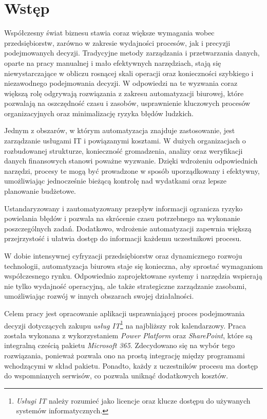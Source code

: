 \chapter{Wstęp}
Współczesny świat biznesu stawia coraz większe wymagania wobec przedsiębiorstw, zarówno w zakresie wydajności procesów, jak i precyzji podejmowanych decyzji. Tradycyjne metody zarządzania i przetwarzania danych, oparte na pracy manualnej i mało efektywnych narzędziach, stają się niewystarczające w obliczu rosnącej skali operacji oraz konieczności szybkiego i niezawodnego podejmowania decyzji. W odpowiedzi na te wyzwania coraz większą rolę odgrywają rozwiązania z zakresu automatyzacji biurowej, które pozwalają na oszczędność czasu i zasobów, usprawnienie kluczowych procesów organizacyjnych oraz minimalizację ryzyka błędów ludzkich.
\par Jednym z obszarów, w którym automatyzacja znajduje zastosowanie, jest zarządzanie usługami IT i powiązanymi kosztami. W dużych organizacjach o rozbudowanej strukturze, konieczność gromadzenia, analizy oraz weryfikacji danych finansowych stanowi poważne wyzwanie. Dzięki wdrożeniu odpowiednich narzędzi, procesy te mogą być prowadzone w sposób uporządkowany i efektywny, umożliwiając jednocześnie bieżącą kontrolę nad wydatkami oraz lepsze planowanie budżetowe.
\par   Ustandaryzowany i zautomatyzowany przepływ informacji ogranicza ryzyko powielania błędów i pozwala na skrócenie czasu potrzebnego na wykonanie poszczególnych zadań. Dodatkowo, wdrożenie automatyzacji zapewnia większą przejrzystość i ułatwia dostęp do informacji każdemu uczestnikowi procesu.
\par W dobie intensywnej cyfryzacji przedsiębiorstw oraz dynamicznego rozwoju technologii, automatyzacja biurowa staje się konieczna, aby sprostać wymaganiom współczesnego rynku. Odpowiednio zaprojektowane systemy i narzędzia wspierają nie tylko wydajność operacyjną, ale także strategiczne zarządzanie zasobami, umożliwiając rozwój w innych obszarach swojej działalności.
\vspace{1cm}
\par Celem pracy jest opracowanie aplikacji usprawniającej proces podejmowania decyzji dotyczących zakupu \emph{usług IT}\footnote{\emph{Usługi IT}  należy rozumieć jako licencje oraz klucze dostępu do używanych systemów informatycznych.} na najbliższy rok kalendarzowy. Praca została wykonana z wykorzystaniem \emph{Power Platform} oraz \emph{SharePoint}, które są integralną cześcią pakietu \emph{Microsoft 365}. Zdecydowano się na wybór tego rozwiązania, ponieważ pozwala ono na prostą integrację między programami wchodzącymi w skład pakietu. Ponadto, każdy z uczestników procesu ma dostęp do wspomnianych serwisów, co pozwala uniknąć dodatkowych kosztów.

